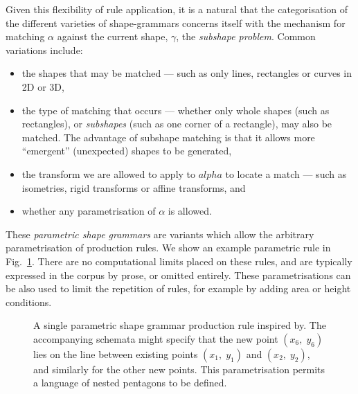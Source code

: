 Given this flexibility of rule application, it is a natural that the categorisation of the different varieties of shape-grammars concerns itself with the mechanism for matching $\alpha$ against the current shape, $\gamma$, the \emph{subshape problem}. Common variations include:

\begin{itemize}
\item the shapes that may be matched --- such as only lines, rectangles or curves in 2D or 3D,
\item the type of matching that occurs --- whether only whole shapes (such as rectangles), or \emph{subshapes} (such as one corner of a rectangle), may also be matched. The advantage of subshape matching is that it allows more ``emergent'' (unexpected) shapes to be generated, 
\item the transform we are allowed to apply to $alpha$ to locate a match --- such as isometries, rigid transforms or affine transforms, and 
\item whether any parametrisation of $\alpha$ is allowed.
\end{itemize}

These \emph{parametric shape grammars}\cite{Stiny80} are variants which allow the arbitrary parametrisation of production rules. We show an example parametric rule in Fig.~\ref{fig:paramShapeGrammar}. There are no computational limits placed on these rules, and are typically expressed in the corpus by prose\cite{Stiny77}, or omitted entirely\cite{Flemming:1987:MTS}. These parametrisations can be also used to limit the repetition of rules, for example by adding area or height conditions. 

\begin{figure}
\centering
\def\svgwidth{0.8\columnwidth}

\caption[A parametric shape grammar production rule]{A single parametric shape grammar production rule inspired by\cite{Stiny80}. The accompanying schemata might specify that the new point $(x_6,\; y_6)$ lies on the line between existing points $(x_1,\; y_1)$ and $(x_2,\; y_2)$, and similarly for the other new points. This parametrisation permits a language of nested pentagons to be defined.}
\label{fig:paramShapeGrammar}
\end{figure}



